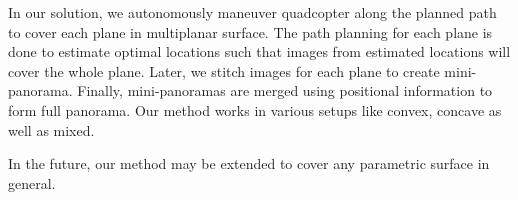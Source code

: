 In our solution, we autonomously maneuver quadcopter along the planned path to
cover each plane in multiplanar surface. The path planning for each plane is
done to estimate optimal locations such that images from estimated locations will cover
the whole plane. Later, we stitch images for each plane to create mini-panorama.
Finally, mini-panoramas are merged using positional information to form full panorama.
Our method works in various setups like convex, concave as well as mixed.

In the future, our method may be extended to cover any parametric surface in
general.
